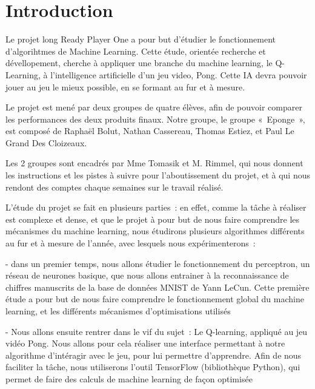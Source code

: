 \documentclass[a4paper,10pt]{article}
\newenvironment{bloc infos}[1]{
    \tcolorbox[beamer,%
    noparskip,breakable, oversize,
    colback=green!10!blue!10!white,
    colframe=green!35!blue!35!white,%
    coltitle=black,
    title=#1]}%
    {\endtcolorbox}
\begin{document}
\newpage
\tableofcontents
\newpage
\listoffigures

\newpage

\section*{Introduction}

Le projet long Ready Player One a pour but d’étudier le fonctionnement d’algorihtmes de Machine Learning. Cette étude, orientée recherche et dévellopement, cherche à appliquer une branche du machine learning, le Q-Learning, à l’intelligence artificielle d’un jeu video, Pong. Cette IA devra pouvoir jouer au jeu le mieux possible, en se formant au fur et à mesure.

Le projet est mené par deux groupes de quatre élèves, afin de pouvoir comparer les performances des deux produits finaux. Notre groupe, le groupe « Eponge », est composé de Raphaël Bolut, Nathan Cassereau, Thomas Estiez, et Paul Le Grand Des Cloizeaux. 

Les 2 groupes sont encadrés par Mme Tomasik et M. Rimmel, qui nous donnent les instructions et les pistes à suivre pour l’aboutissement du projet, et à qui nous rendont des comptes chaque semaines sur le travail réalisé.

L’étude du projet se fait en plusieurs parties : en effet, comme la tâche à réaliser est complexe et dense, et que le projet à pour but de nous faire comprendre les mécanismes du machine learning, nous étudirons plusieurs algorithmes différents au fur et à mesure de l’année, avec lesquels nous expérimenterons : 

- dans un premier temps, nous allons étudier le fonctionnement du perceptron, un réseau de neurones basique, que nous allons entrainer à la reconnaissance de chiffres manuscrits de la base de données MNIST de Yann LeCun. Cette première étude a pour but de nous faire comprendre le fonctionnement global du machine learning, et les différents mécanismes d’optimisations utilisés

- Nous allons ensuite rentrer dans le vif du sujet : Le Q-learning, appliqué au jeu vidéo Pong. Nous allons pour cela réaliser une interface permettant à notre algorithme d’intéragir avec le jeu, pour lui permettre d’apprendre. Afin de nous faciliter la tâche, nous utiliserons l’outil TensorFlow (bibliothèque Python), qui permet de faire des calculs de machine learning de façon optimisée
\end{document}
